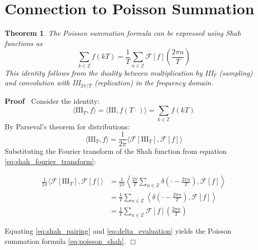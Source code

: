 \documentclass{article}
\newcommand{\tmrsub}[1]{\ensuremath{_{\textrm{#1}}}}
\newenvironment{proof}{\noindent\textbf{Proof\ }}{\hspace*{\fill}$\Box$\medskip}
\newtheorem{theorem}{Theorem}
\begin{document}
\section{Connection to Poisson Summation}

\begin{theorem}
  \label{thm:poisson_shah_connection}The Poisson summation formula can be
  expressed using Shah functions as
  \begin{equation}
    \label{eq:poisson_shah} \sum_{k \in \mathbb{Z}} f (kT) = \frac{1}{T} 
    \sum_{n \in \mathbb{Z}} \mathcal{F} [f] \left( \frac{2 \pi n}{T} \right)
  \end{equation}
  This identity follows from the duality between multiplication by
  III\tmrsub{$T$} (sampling) and convolution with III\tmrsub{$2 \pi / T$}
  (replication) in the frequency domain.
\end{theorem}

\begin{proof}
  Consider the identity:
  \begin{equation}
    \label{eq:shah_pairing} \langle \text{III}_T, f \rangle = \langle
    \text{III}, f (T \cdot) \rangle = \sum_{k \in \mathbb{Z}} f (kT)
  \end{equation}
  By Parseval's theorem for distributions:
  \begin{equation}
    \label{eq:parseval_shah} \langle \text{III}_T, f \rangle = \frac{1}{2 \pi}
    \langle \mathcal{F}[\text{III}_T], \mathcal{F}[f] \rangle
  \end{equation}
  Substituting the Fourier transform of the Shah function from equation
  \eqref{eq:shah_fourier_transform}:
  
  \begin{align}
    \frac{1}{2 \pi}  \langle \mathcal{F}[\text{III}_T], \mathcal{F}[f] \rangle
    & = \frac{1}{2 \pi}  \left\langle \frac{2 \pi}{T}  \sum_{n \in \mathbb{Z}}
    \delta \left( \cdot - \frac{2 \pi n}{T} \right), \mathcal{F}[f]
    \right\rangle  \label{eq:substitute_shah_fourier_full}\\
    & = \frac{1}{T}  \sum_{n \in \mathbb{Z}} \left\langle \delta \left( \cdot
    - \frac{2 \pi n}{T} \right), \mathcal{F}[f] \right\rangle 
    \label{eq:factor_constants_poisson}\\
    & = \frac{1}{T}  \sum_{n \in \mathbb{Z}} \mathcal{F} [f] \left( \frac{2
    \pi n}{T} \right)  \label{eq:delta_evaluation}
  \end{align}
  
  Equating \eqref{eq:shah_pairing} and \eqref{eq:delta_evaluation} yields the
  Poisson summation formula \eqref{eq:poisson_shah}.
\end{proof}
\end{document}
